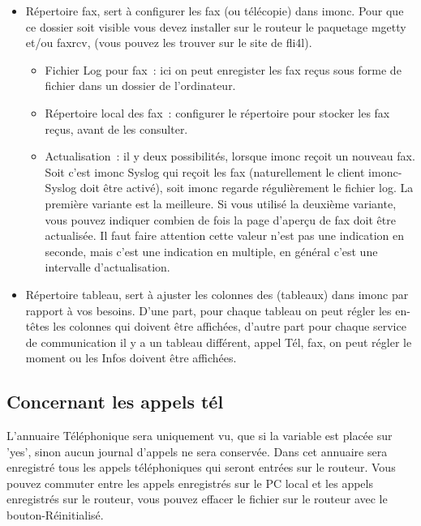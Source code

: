 \begin{itemize}
  \item Répertoire fax, sert à configurer les fax (ou télécopie) dans imonc. Pour
    que ce dossier soit visible vous devez installer sur le routeur le paquetage
    mgetty et/ou faxrcv, (vous pouvez les trouver sur le site de fli4l).
    \begin{itemize}
      \item Fichier Log pour fax~: ici on peut enregister les fax reçus sous forme
        de fichier dans un dossier de l'ordinateur.
      \item Répertoire local des fax~: configurer le répertoire pour stocker les
        fax reçus, avant de les consulter.
      \item Actualisation~: il y deux possibilités, lorsque imonc reçoit un
        nouveau fax. Soit c'est imonc Syslog qui reçoit les fax (naturellement
        le client imonc-Syslog doit être activé), soit imonc regarde régulièrement
        le fichier log. La première variante est la meilleure. Si vous utilisé la
        deuxième variante, vous pouvez indiquer combien de fois la page d'aperçu de
        fax doit être actualisée. Il faut faire attention cette valeur n'est pas
        une indication en seconde, mais c'est une indication en multiple,
        en général c'est une intervalle d'actualisation.
    \end{itemize}

  \item Répertoire tableau, sert à ajuster les colonnes des (tableaux) dans imonc
    par rapport à vos besoins. D'une part, pour chaque tableau on peut régler les
    en-têtes les colonnes qui doivent être affichées, d'autre part pour chaque
    service de communication il y a un tableau différent, appel Tél, fax, on peut
    régler le moment ou les Infos doivent être affichées.
  \end{itemize}

  \subsection{Concernant les appels tél}

  L'annuaire Téléphonique sera uniquement vu, que si la variable 
  est placée sur 'yes', sinon aucun journal d'appels ne sera conservée. Dans cet
  annuaire sera enregistré tous les appels téléphoniques qui seront entrées sur
  le routeur. Vous pouvez commuter entre les appels enregistrés sur le PC local
  et les appels enregistrés sur le routeur, vous pouvez effacer le fichier sur
  le routeur avec le bouton-Réinitialisé.

